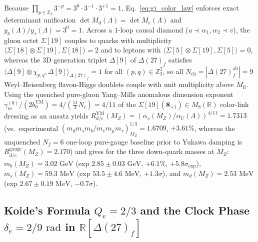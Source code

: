 \documentclass[11pt,a4paper]{article}
\theoremstyle{definition}
\theoremstyle{remark}
\newcommand{\R}{\mathbb{R}}
\newcommand{\Z}{\mathbb{Z}}
\begin{document}
Because $\prod_{p \in \Z_3} 3^{-p} = 3^0 \cdot 3^{-1} \cdot 3^{+1} = 1$, Eq.~\eqref{eq:gj_color_law} enforces exact determinant unification $\det M_d(\Lambda) = \det M_e(\Lambda)$ and $y_b(\Lambda)/y_\tau(\Lambda) = 3^0 = 1$. Across a $1$-loop causal diamond ($u \prec w_1, w_2 \prec v$), the gluon octet $\Sigma[19]$ couples to quarks with multiplicity $\langle \Sigma[18] \otimes \Sigma[19], \Sigma[18]\rangle = 2$ and to leptons with $\langle \Sigma[5] \otimes \Sigma[19], \Sigma[5]\rangle = 0$, whereas the $3$D generation triplet $\Delta[9]$ of $\Delta(27)_f$ satisfies $\langle \Delta[9] \otimes \chi_{p,q}, \Delta[9]\rangle_{\Delta(27)_f} = 1$ for all $(p, q) \in \Z_3^2$, so all $N_{\mathrm{ch}} = |\Delta(27)_f^{\mathrm{ab}}| = 9$ Weyl--Heisenberg flavon-Higgs doublets couple with unit multiplicity above $M_{\mathrm{fl}}$. Using the quenched pure-gluon Yang--Mills anomalous dimension exponent $\gamma_m^{(0)} / (2 b_0^{\mathrm{YM}}) = 4 / (\frac{11}{3}N_c) = 4/11$ of the $\Sigma[19](\mathbf{8}_{+1}) \in M_8(\R)$ color-link dressing as an ansatz yields $R_{d/e}^{\mathrm{YM}}(M_Z) = (\alpha_s(M_Z)/\alpha_U(\Lambda))^{4/11} = 1.7313$ (vs.\ experimental $(m_d m_s m_b / m_e m_\mu m_\tau)_{M_Z}^{1/3} = 1.6709$, $+3.61\%$, whereas the unquenched $N_f = 6$ one-loop pure-gauge baseline prior to Yukawa damping is $R_{d/e}^{\mathrm{gauge}}(M_Z) = 2.170$) and gives for the three down-quark masses at $M_Z$: $m_b(M_Z) = 3.02\text{ GeV}$ (exp $2.85 \pm 0.03\text{ GeV}$, $+6.1\%$, $+5.8\sigma_{\mathrm{exp}}$), $m_s(M_Z) = 59.3\text{ MeV}$ (exp $53.5 \pm 4.6\text{ MeV}$, $+1.3\sigma$), and $m_d(M_Z) = 2.53\text{ MeV}$ (exp $2.67 \pm 0.19\text{ MeV}$, $-0.7\sigma$).

\subsection{Koide's Formula $Q_e = 2/3$ and the Clock Phase $\delta_e = 2/9\text{ rad}$ in $\R[\Delta(27)_f]$}
\end{document}
